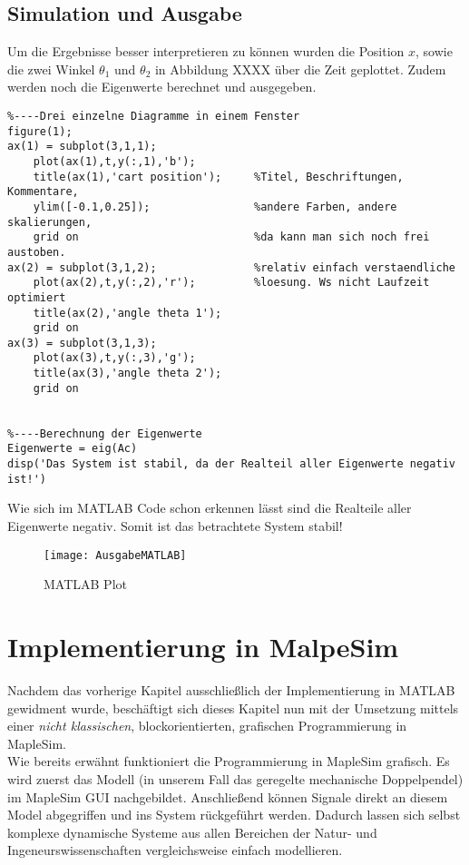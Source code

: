 \documentclass[a4paper, 10pt]{report}
\begin{document}
\section{Simulation und Ausgabe}
Um die Ergebnisse besser interpretieren zu können wurden die Position $x$, sowie die zwei Winkel $\theta_{1}$ und $\theta_{2}$ in Abbildung XXXX über die Zeit geplottet. Zudem werden noch die Eigenwerte berechnet und ausgegeben.  
\begin{lstlisting}
%----Drei einzelne Diagramme in einem Fenster
figure(1);
ax(1) = subplot(3,1,1);
    plot(ax(1),t,y(:,1),'b');
    title(ax(1),'cart position');     %Titel, Beschriftungen, Kommentare,
    ylim([-0.1,0.25]);                %andere Farben, andere skalierungen,
    grid on                           %da kann man sich noch frei austoben.
ax(2) = subplot(3,1,2);               %relativ einfach verstaendliche 
    plot(ax(2),t,y(:,2),'r');         %loesung. Ws nicht Laufzeit optimiert
    title(ax(2),'angle theta 1');
    grid on
ax(3) = subplot(3,1,3);
    plot(ax(3),t,y(:,3),'g');
    title(ax(3),'angle theta 2');
    grid on


%----Berechnung der Eigenwerte
Eigenwerte = eig(Ac)
disp('Das System ist stabil, da der Realteil aller Eigenwerte negativ ist!')

\end{lstlisting}
Wie sich im MATLAB Code schon erkennen lässt sind die Realteile aller Eigenwerte negativ. Somit ist das betrachtete System stabil!

\begin{figure}[h]
\centering  %
{\texttt{[image: AusgabeMATLAB]}}
\caption{MATLAB Plot}
\end{figure}

\renewcommand{\thechapter}{}
\chapter{Implementierung in MalpeSim}
\renewcommand{\thechapter}{4}
Nachdem das vorherige Kapitel ausschließlich der Implementierung in MATLAB gewidment wurde, beschäftigt sich dieses Kapitel nun mit der Umsetzung mittels einer \textit{nicht klassischen}, blockorientierten, grafischen Programmierung in MapleSim. \\
Wie bereits erwähnt funktioniert die Programmierung in MapleSim grafisch. Es wird zuerst das Modell (in unserem Fall das geregelte mechanische Doppelpendel) im MapleSim GUI nachgebildet. Anschließend können Signale direkt an diesem Model abgegriffen und ins System rückgeführt werden. Dadurch lassen sich selbst komplexe dynamische Systeme aus allen Bereichen der Natur- und Ingeneurswissenschaften vergleichsweise einfach modellieren.
\end{document}
